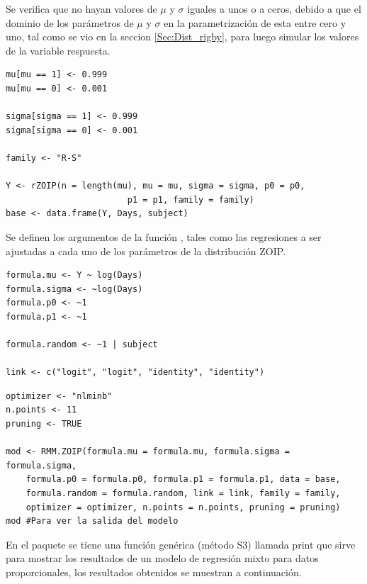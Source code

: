 Se verifica que no hayan valores de $\mu$ y $\sigma$ iguales a unos o a ceros, debido a que el dominio de los par\'{a}metros de $\mu$ y $\sigma$ en la parametrizaci\'{o}n de \cite{Stasinopoulos2} esta entre cero y uno, tal como se vio en la seccion \ref{Sec:Dist_rigby}, para luego simular los valores de la variable respuesta.

\begin{verbatim}
mu[mu == 1] <- 0.999
mu[mu == 0] <- 0.001

sigma[sigma == 1] <- 0.999
sigma[sigma == 0] <- 0.001

family <- "R-S"

Y <- rZOIP(n = length(mu), mu = mu, sigma = sigma, p0 = p0, 
						p1 = p1, family = family)
base <- data.frame(Y, Days, subject)
\end{verbatim}

Se definen los argumentos de la funci\'{o}n , tales como las regresiones a ser ajustadas a cada uno de los par\'{a}metros de la distribuci\'{o}n ZOIP.

\begin{verbatim}
formula.mu <- Y ~ log(Days)
formula.sigma <- ~log(Days)
formula.p0 <- ~1
formula.p1 <- ~1

formula.random <- ~1 | subject

link <- c("logit", "logit", "identity", "identity")
\end{verbatim}
\begin{verbatim}
optimizer <- "nlminb"
n.points <- 11
pruning <- TRUE

mod <- RMM.ZOIP(formula.mu = formula.mu, formula.sigma = formula.sigma, 
    formula.p0 = formula.p0, formula.p1 = formula.p1, data = base, 
    formula.random = formula.random, link = link, family = family, 
    optimizer = optimizer, n.points = n.points, pruning = pruning)
mod #Para ver la salida del modelo
\end{verbatim}

En el paquete  se tiene una funci\'{o}n gen\'{e}rica (m\'{e}todo S3) llamada print que sirve para mostrar los resultados de un modelo de regresi\'{o}n mixto para datos proporcionales, los resultados obtenidos se muestran a continuaci\'{o}n.

